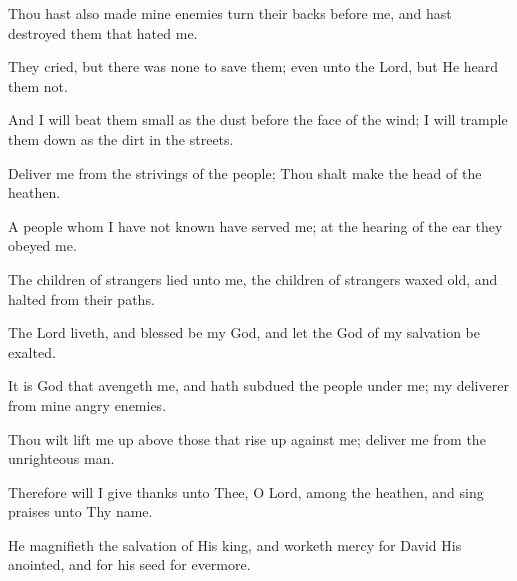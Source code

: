 Thou hast also made mine enemies turn their backs before me, and hast destroyed them that hated me.

They cried, but there was none to save them; even unto the Lord, but He heard them not.

And I will beat them small as the dust before the face of the wind; I will trample them down as the dirt in the streets.

Deliver me from the strivings of the people; Thou shalt make the head of the heathen.

A people whom I have not known have served me; at the hearing of the ear they obeyed me.

The children of strangers lied unto me, the children of strangers waxed old, and halted from their paths.

The Lord liveth, and blessed be my God, and let the God of my salvation be exalted.

It is God that avengeth me, and hath subdued the people under me; my deliverer from mine angry enemies.

Thou wilt lift me up above those that rise up against me; deliver me from the unrighteous man.

Therefore will I give thanks unto Thee, O Lord, among the heathen, and sing praises unto Thy name.

He magnifieth the salvation of His king, and worketh mercy for David His anointed, and for his seed for evermore.
